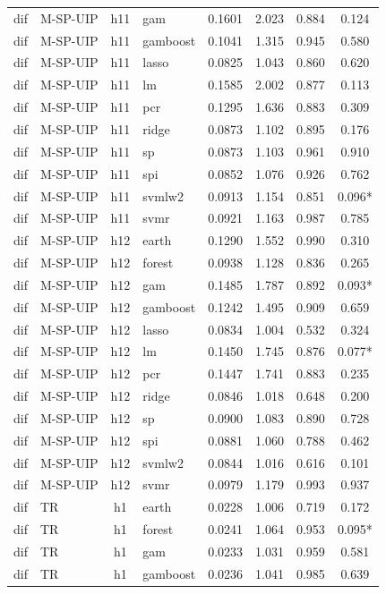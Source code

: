 \begin{ThreePartTable}
\begin{longtable}[t]{llclcccc}
dif & M-SP-UIP & h11 & gam & 0.1601 & 2.023 & 0.884 & 0.124\\
dif & M-SP-UIP & h11 & gamboost & 0.1041 & 1.315 & 0.945 & 0.580\\
dif & M-SP-UIP & h11 & lasso & 0.0825 & 1.043 & 0.860 & 0.620\\
dif & M-SP-UIP & h11 & lm & 0.1585 & 2.002 & 0.877 & 0.113\\
dif & M-SP-UIP & h11 & pcr & 0.1295 & 1.636 & 0.883 & 0.309\\
dif & M-SP-UIP & h11 & ridge & 0.0873 & 1.102 & 0.895 & 0.176\\
dif & M-SP-UIP & h11 & sp & 0.0873 & 1.103 & 0.961 & 0.910\\
dif & M-SP-UIP & h11 & spi & 0.0852 & 1.076 & 0.926 & 0.762\\
dif & M-SP-UIP & h11 & svmlw2 & 0.0913 & 1.154 & 0.851 & 0.096*\\
dif & M-SP-UIP & h11 & svmr & 0.0921 & 1.163 & 0.987 & 0.785\\
\addlinespace
dif & M-SP-UIP & h12 & earth & 0.1290 & 1.552 & 0.990 & 0.310\\
dif & M-SP-UIP & h12 & forest & 0.0938 & 1.128 & 0.836 & 0.265\\
dif & M-SP-UIP & h12 & gam & 0.1485 & 1.787 & 0.892 & 0.093*\\
dif & M-SP-UIP & h12 & gamboost & 0.1242 & 1.495 & 0.909 & 0.659\\
dif & M-SP-UIP & h12 & lasso & 0.0834 & 1.004 & 0.532 & 0.324\\
dif & M-SP-UIP & h12 & lm & 0.1450 & 1.745 & 0.876 & 0.077*\\
dif & M-SP-UIP & h12 & pcr & 0.1447 & 1.741 & 0.883 & 0.235\\
dif & M-SP-UIP & h12 & ridge & 0.0846 & 1.018 & 0.648 & 0.200\\
dif & M-SP-UIP & h12 & sp & 0.0900 & 1.083 & 0.890 & 0.728\\
dif & M-SP-UIP & h12 & spi & 0.0881 & 1.060 & 0.788 & 0.462\\
dif & M-SP-UIP & h12 & svmlw2 & 0.0844 & 1.016 & 0.616 & 0.101\\
dif & M-SP-UIP & h12 & svmr & 0.0979 & 1.179 & 0.993 & 0.937\\
\addlinespace
dif & TR & h1 & earth & 0.0228 & 1.006 & 0.719 & 0.172\\
dif & TR & h1 & forest & 0.0241 & 1.064 & 0.953 & 0.095*\\
dif & TR & h1 & gam & 0.0233 & 1.031 & 0.959 & 0.581\\
dif & TR & h1 & gamboost & 0.0236 & 1.041 & 0.985 & 0.639\\

\end{longtable}
\end{ThreePartTable}
